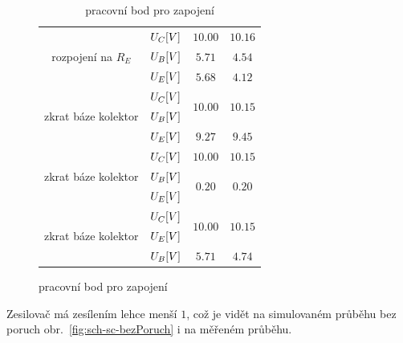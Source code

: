 \documentclass{article}
\newcommand \obr[1]
{ obr.~\ref{#1}}
\begin{document}
\begin{figure}[H]
\begin{minipage}[t]{0.4\textwidth}
\begin{table}[H]
\begin{tabular}{|c|c|c|c|}
      \multirow{3}{*}{rozpojení na \(R_{E}\)}   &	\(U_C\-[V]\)  & \(10.00\)                  & \(10.16\)                  \\ \cline{2-4}
                                                & \(U_B\-[V]\)  & \(5.71\)                   & \(4.54\)                   \\ \cline{2-4}
                                                & \(U_E\-[V]\)  & \(5.68\)                   & \(4.12\)                   \\ \hline
      \multirow{3}{*}{zkrat báze kolektor}      &	\(U_C\-[V]\)  & \multirow{2}{*}{\(10.00\)} & \multirow{2}{*}{\(10.15\)} \\ \cline{2-2} 
                                                & \(U_B\-[V]\)  &                            &                            \\ \cline{2-4}
                                                & \(U_E\-[V]\)  & \(9.27\)                   & \(9.45\)                   \\ \hline
      \multirow{3}{*}{zkrat báze kolektor}      &	\(U_C\-[V]\)  & \(10.00\)                  & \(10.15\)                  \\ \cline{2-4}
                                                & \(U_B\-[V]\)  & \multirow{2}{*}{\(0.20\)}  & \multirow{2}{*}{\(0.20\)}  \\ \cline{2-2}
                                                & \(U_E\-[V]\)  &                            &                            \\ \hline
      \multirow{3}{*}{zkrat báze kolektor}      &	\(U_C\-[V]\)  & \multirow{2}{*}{\(10.00\)} & \multirow{2}{*}{\(10.15\)} \\ \cline{2-2}
                                                & \(U_E\-[V]\)  &                            &                            \\ \cline{2-4}
                                                & \(U_B\-[V]\)  & \(5.71\)                   & \(4.74\)                   \\ \hline
      \end{tabular}
      \caption{\label{pracovni_bod} pracovní bod pro zapojení }
    \end{table}
  \end{minipage}
\end{figure}

Zesilovač má zesílením lehce menší \(1\), což je vidět na simulovaném průběhu bez poruch \obr{fig:sch-sc-bezPoruch} i na měřeném průběhu.
\end{document}

